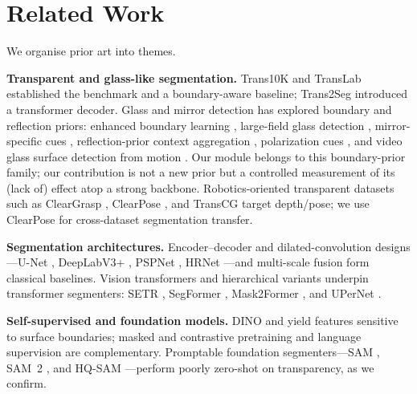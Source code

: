 \section{Related Work}
We organise prior art into themes.

\textbf{Transparent and glass-like segmentation.} Trans10K and TransLab
\cite{xie2020translab} established the benchmark and a boundary-aware baseline;
Trans2Seg \cite{xie2021trans2seg} introduced a transformer decoder. Glass and
mirror detection has explored boundary and reflection priors: enhanced boundary
learning \cite{he2021eblnet}, large-field glass detection \cite{mei2020gdnet},
mirror-specific cues \cite{yang2019mirrornet}, reflection-prior context
aggregation \cite{lin2021gsd}, polarization cues
\cite{mei2022polarization}, and video glass surface detection from motion
\cite{liu2024vgsd}. Our \brf{} module belongs to this boundary-prior
family; our contribution is not a new prior but a controlled measurement of its
(lack of) effect atop a strong backbone. Robotics-oriented transparent datasets
such as ClearGrasp \cite{sajjan2020cleargrasp}, ClearPose
\cite{chen2022clearpose}, and TransCG \cite{fang2022transcg} target depth/pose;
we use ClearPose for cross-dataset segmentation transfer.

\textbf{Segmentation architectures.} Encoder--decoder and dilated-convolution
designs---U-Net \cite{ronneberger2015unet}, DeepLabV3+
\cite{chen2018deeplabv3plus}, PSPNet \cite{zhao2017pspnet}, HRNet
\cite{wang2020hrnet}---and multi-scale fusion \cite{lin2017fpn} form classical
baselines. Vision transformers \cite{dosovitskiy2021vit} and hierarchical
variants \cite{liu2021swin} underpin transformer segmenters: SETR
\cite{zheng2021setr}, SegFormer \cite{xie2021segformer}, Mask2Former
\cite{cheng2022mask2former}, and UPerNet \cite{xiao2018upernet}.

\textbf{Self-supervised and foundation models.} DINO \cite{caron2021dino} and
\dinov{} \cite{oquab2023dinov2} yield features sensitive to surface boundaries;
masked \cite{he2022mae} and contrastive \cite{he2020moco} pretraining and
language supervision \cite{radford2021clip} are complementary. Promptable
foundation segmenters---SAM \cite{kirillov2023sam}, SAM~2
\cite{ravi2024sam2}, and HQ-SAM \cite{ke2023hqsam}---perform poorly zero-shot on
transparency, as we confirm.

